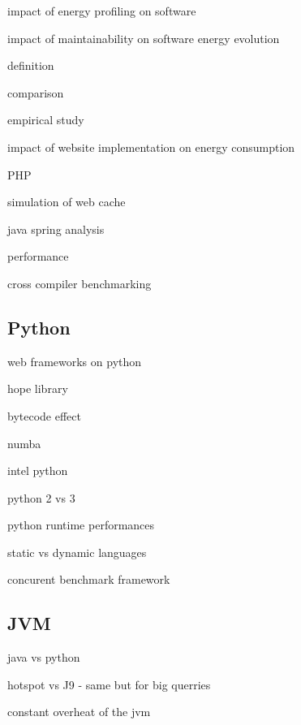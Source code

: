 impact of energy profiling on software \cite{jagroep2017energy}

impact of maintainability on software energy evolution \cite{calero2021does}

definition \cite{wang1993grpc}

comparison \cite{chamas2017comparing}

empirical study \cite{de2021empirical}

impact of website implementation on energy consumption \cite{philippot_characterization_2014} \cite{manotas2013investigating}

PHP \cite{benmoussa_new_2019} \cite{das_comparison_2016}

simulation of web cache \cite{cardenas_performance_2005}

java spring analysis \cite{gajewski_analysis_2019}

performance \cite{mishra2021web}


cross compiler benchmarking \cite{yet2016cross}

\subsection{Python}

web frameworks on python \cite{pankiv_concurrent_nodate}

hope library \cite{akeret_hope_2015}

bytecode effect \cite{ben_asher_effect_2009}

numba \cite{crist_dask_2016}

intel python \cite{li_boosting_2016}

python 2 vs 3 \cite{modzelewski_pyston_2020}

python runtime performances \cite{redondo_comprehensive_2015} \cite{murri_performance_2013}

static vs dynamic languages \cite{pang_what_nodate}

concurent benchmark framework \cite{pankiv2019concurrent}


\subsection{JVM}

java vs python \cite{destefanis_statistical_2016}

hotspot vs J9 \cite{oi2011power} - same but for big querries \cite{chiba2018towards}

constant overheat of the jvm \cite{lafond2006energy}

